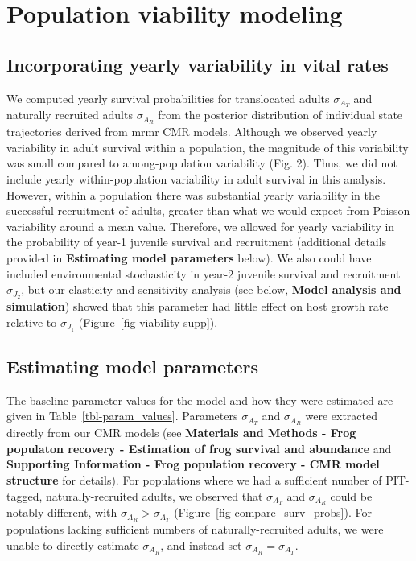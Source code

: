 \documentclass[9pt,twoside,lineno]{pnas-new-SI}
\begin{document}
\hypertarget{population-viability-modeling-1}{%
\section{Population viability
modeling}\label{population-viability-modeling-1}}

\hypertarget{incorporating-yearly-variability-in-vital-rates}{%
\subsection{Incorporating yearly variability in vital
rates}\label{incorporating-yearly-variability-in-vital-rates}}

We computed yearly survival probabilities for translocated adults
\(\sigma_{A_T}\) and naturally recruited adults \(\sigma_{A_R}\) from
the posterior distribution of individual state trajectories derived from
mrmr CMR models. Although we observed yearly variability in adult
survival within a population, the magnitude of this variability was
small compared to among-population variability
(Fig. 2). Thus, we did not include
yearly within-population variability in adult survival in this analysis.
However, within a population there was substantial yearly variability in
the successful recruitment of adults, greater than what we would expect
from Poisson variability around a mean value. Therefore, we allowed for
yearly variability in the probability of year-1 juvenile survival and
recruitment (additional details provided in \textbf{Estimating model
parameters} below). We also could have included environmental
stochasticity in year-2 juvenile survival and recruitment
\(\sigma_{J_2}\), but our elasticity and sensitivity analysis (see
below, \textbf{Model analysis and simulation}) showed that this
parameter had little effect on host growth rate relative to
\(\sigma_{J_1}\) (Figure~\ref{fig-viability-supp}).

\hypertarget{estimating-model-parameters}{%
\subsection{Estimating model
parameters}\label{estimating-model-parameters}}

The baseline parameter values for the model and how they were estimated
are given in Table~\ref{tbl-param_values}. Parameters \(\sigma_{A_T}\)
and \(\sigma_{A_R}\) were extracted directly from our CMR models (see
\textbf{Materials and Methods - Frog populaton recovery - Estimation of
frog survival and abundance} and \textbf{Supporting Information - Frog
population recovery - CMR model structure} for details). For populations
where we had a sufficient number of PIT-tagged, naturally-recruited
adults, we observed that \(\sigma_{A_T}\) and \(\sigma_{A_R}\) could be
notably different, with \(\sigma_{A_R} > \sigma_{A_T}\)
(Figure~\ref{fig-compare_surv_probs}). For populations lacking
sufficient numbers of naturally-recruited adults, we were unable to
directly estimate \(\sigma_{A_R}\), and instead set
\(\sigma_{A_R} = \sigma_{A_T}\).
\end{document}
